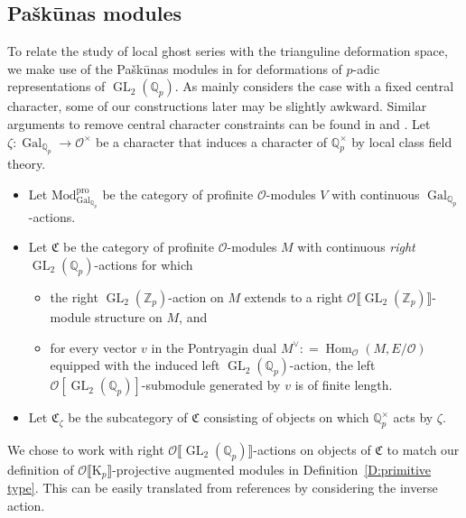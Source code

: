 \documentclass[12pt]{amsart}
\theoremstyle{definition}
\numberwithin{equation}{subsection}
\def\calO{\mathcal{O}}
\def\gothC{\mathfrak{C}}
\def\QQ{\mathbb{Q}}
\def\ZZ{\mathbb{Z}}
\def\rmK{\mathrm{K}}
\DeclareMathOperator{\Gal}{Gal}
\DeclareMathOperator{\GL}{GL}
\DeclareMathOperator{\Hom}{Hom}
\newcommand{\Mod}{\mathrm{Mod}}
\newcommand{\sm}{\mathrm{sm}}
\newcommand{\pro}{\mathrm{pro}}
\begin{document}
\subsection{Pa\v sk\= unas modules}
\label{S:Paskunas functor}
To relate the study of local ghost series with the trianguline deformation space, we make use of the Pa\v sk\= unas modules in \cite{paskunas-functor} for deformations of $p$-adic representations of $\GL_2(\QQ_p)$. As \cite{paskunas-functor} mainly considers the case with a fixed central character, some of our constructions later may be slightly awkward. Similar arguments to remove central character constraints can be found in \cite[Appendix~A]{breuil-ding} and \cite{six author2}. Let $\zeta: \Gal_{\QQ_p} \to \calO^\times$ be  a character that induces a character of $\QQ_p^\times$ by local class field theory.
\begin{itemize}
\item Let $\Mod_{\Gal_{\QQ_p}}^\pro$ be the category of profinite $\calO$-modules $V$ with continuous $\Gal_{\QQ_p}$-actions.
\item Let $\gothC$ be the category of profinite $\calO$-modules $M$ with continuous \emph{right} $\GL_2(\QQ_p)$-actions for which
\begin{itemize}
\item the right $\GL_2(\ZZ_p)$-action on $M$ extends to a right $\calO\llbracket \GL_2(\ZZ_p)\rrbracket$-module structure on $M$, and
\item for every vector $v$ in the Pontryagin dual $M^\vee: = \Hom_\calO(M, E/\calO)$ equipped with the induced left $\GL_2(\QQ_p)$-action, the left $\calO[\GL_2(\QQ_p)]$-submodule generated by $v$ is of finite length. 
\end{itemize}
\item Let $\gothC_\zeta$ be the subcategory of $\gothC$ consisting of objects on which $\QQ_p^\times$ acts by $\zeta$.

\end{itemize}
We chose to work with right $\calO\llbracket \GL_2(\QQ_p)\rrbracket$-actions on objects of $\gothC$ to match our definition of $\calO\llbracket \rmK_p\rrbracket$-projective augmented modules in Definition~\ref{D:primitive type}. This can be easily translated from references \cite{paskunas-functor,paskunas-BM,hu-paskunas,breuil-ding} by considering the inverse action.
\end{document}
